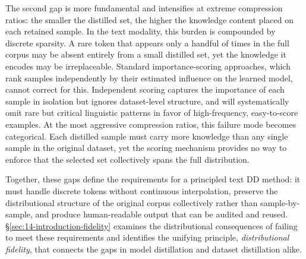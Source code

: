 \begin{foldable}
  The second gap is more fundamental and intensifies at extreme compression ratios: the smaller the distilled set, the higher the knowledge content placed on each retained sample.
  In the text modality, this burden is compounded by discrete sparsity.
  A rare token that appears only a handful of times in the full corpus may be absent entirely from a small distilled set, yet the knowledge it encodes may be irreplaceable.
  Standard importance-scoring approaches, which rank samples independently by their estimated influence on the learned model, cannot correct for this.
  Independent scoring captures the importance of each sample in isolation but ignores dataset-level structure, and will systematically omit rare but critical linguistic patterns in favor of high-frequency, easy-to-score examples.
  At the most aggressive compression ratios, this failure mode becomes categorical.
  Each distilled sample must carry more knowledge than any single sample in the original dataset, yet the scoring mechanism provides no way to enforce that the selected set collectively spans the full distribution.
\end{foldable}

\begin{foldable}
  Together, these gaps define the requirements for a principled text \ac{DD} method: it must handle discrete tokens without continuous interpolation, preserve the distributional structure of the original corpus collectively rather than sample-by-sample, and produce human-readable output that can be audited and reused.
  \S\ref{sec:14-introduction-fidelity} examines the distributional consequences of failing to meet these requirements and identifies the unifying principle, \textit{distributional fidelity}, that connects the gaps in model distillation and dataset distillation alike.
\end{foldable}
